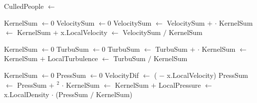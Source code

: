 
\begin{algorithmic}[1]

    \State CulledPeople $\gets$ 
\EndFor
\EndFunction


    \State KernelSum $\gets 0$
    \State VelocitySum $\gets 0$
        \State VelocitySum $\gets$ VelocitySum $+$  $\cdot$ 
        \State KernelSum $\gets$ KernelSum $+$ 
    \EndFor
    \State x.LocalVelocity $\gets$ VelocitySum $/$ KernelSum
\EndFor

    \State KernelSum $\gets 0$
    \State TurbuSum $\gets 0$
        \State TurbuSum $\gets$ TurbuSum $+$  $\cdot$ 
        \State KernelSum $\gets$ KernelSum $+$ 
    \EndFor
    \State LocalTurbulence $\gets$ TurbuSum $/$ KernelSum
\EndFor

    \State KernelSum $\gets 0$
    \State PressSum $\gets 0$
        \State VelocityDif $\gets$ ( $-$ x.LocalVelocity)
        \State PressSum $\gets$ PressSum $+$ $^2$ $\cdot$ 
        \State KernelSum $\gets$ KernelSum $+$ 
    \EndFor
    \State LocalPressure $\gets$ x.LocalDensity $\cdot$ (PressSum $/$ KernelSum)
\EndFor
\EndFunction
\end{algorithmic}